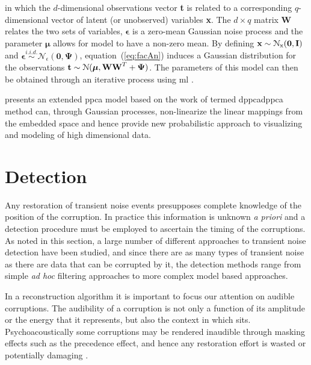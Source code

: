 in which the $d$-dimensional observations vector \textbf{t} is related to a corresponding $q$-dimensional vector of latent (or unobserved) variables \textbf{x}. The $d \times q$ matrix \textbf{W} relates the two sets of variables, $\boldsymbol\epsilon$ is a zero-mean Gaussian noise process and the parameter $\boldsymbol\mu$ allows for \DIFaddbegin {}\DIFaddend model to have a non-zero mean. By defining $\textrm{\textbf{x}} \sim \mathcal{N}_\textrm{x}(\boldsymbol0,\textrm{\textbf{I}})$ and $\boldsymbol\epsilon \stackrel{i.i.d.}{\sim} \mathcal{N}_\epsilon(\boldsymbol0,\boldsymbol\Psi)$, equation~(\ref{eq:facAn}) induces a Gaussian distribution for the observations $\textrm{\textbf{t}} \sim \mathcal{N}(\boldsymbol\mu,\textrm{\textbf{W}}\textrm{\textbf{W}}^T + \boldsymbol\Psi)$. The parameters of this model can then be obtained through an iterative process using \DIFdelbegin {}\DIFdelend \DIFaddbegin \gls{ml} \DIFaddend \citep{Tipping1999}.

 \cite{Lawrence2005} presents an extended \DIFdelbegin {}\DIFdelend \DIFaddbegin \gls{ppca} \DIFaddend model based on the work of \cite{Tipping1999} termed \DIFdelbegin {}\DIFdelend \DIFaddbegin \gls{dppca}\gls{dppca} \DIFaddend method can, through Gaussian processes, non-linearize the linear mappings from the embedded space and hence provide \DIFaddbegin {}\DIFaddend new probabilistic approach to \DIFaddbegin {}\DIFaddend visualizing and modeling of high dimensional data.



\section{Detection}\label{sec:LitRev_Detection}
Any restoration of transient noise events presupposes complete knowledge of the position of the corruption. In practice this information is unknown \emph{a priori} and a detection procedure must be employed to ascertain the timing of the corruptions. As noted in this section, a large number of different approaches to transient noise detection have been studied, and since there are as many types of transient noise as there are data that can be corrupted by it, the detection methods range from simple \emph{ad hoc} filtering approaches to more complex model based approaches.

In a reconstruction algorithm it is important to focus our attention on audible corruptions. The audibility of a corruption is not only a function of its amplitude or the energy that it represents, but also the context in which \DIFdelbegin {}\DIFdelend \DIFaddbegin {}\DIFaddend sits. Psychoacoustically some corruptions may be rendered inaudible through masking effects such as the precedence effect, and hence any restoration effort is wasted or potentially damaging \cite{Moore2003}.

